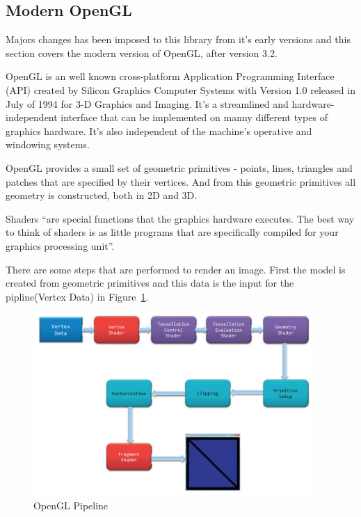 
\subsection{Modern OpenGL} %
\label{sub:modern_opengl}

Majors changes has been imposed to this library from it's early versions and this section covers the modern version of OpenGL, after version 3.2.

OpenGL is an well known cross-platform Application Programming Interface (API) created by Silicon Graphics Computer Systems with Version 1.0 released in July of 1994 for 3-D Graphics and Imaging. It's a streamlined and hardware-independent interface that can be implemented on manny different types of graphics hardware. It's also independent of the machine's operative and windowing systems.

OpenGL provides a small set of geometric primitives - points, lines, triangles and patches that are specified by their vertices. And from this geometric primitives all geometry is constructed, both in 2D and 3D. 

Shaders ``are special functions that the graphics hardware executes. The best way to think of shaders is as little programs that are specifically compiled for your graphics processing unit''. \cite{shreiner2013opengl}

There are some steps that are performed to render an image. First the model is created from geometric primitives and this data is the input  for the pipline(Vertex Data) in Figure~\ref{fig:OGLPipeline}. 

\begin{figure}[htbp]
	\centering
	\includegraphics[width=0.95\textwidth]{img/OpenGL/pipeline.png}
	\caption{OpenGL Pipeline \cite{shreiner2013opengl}}
	\label{fig:OGLPipeline}
\end{figure}


